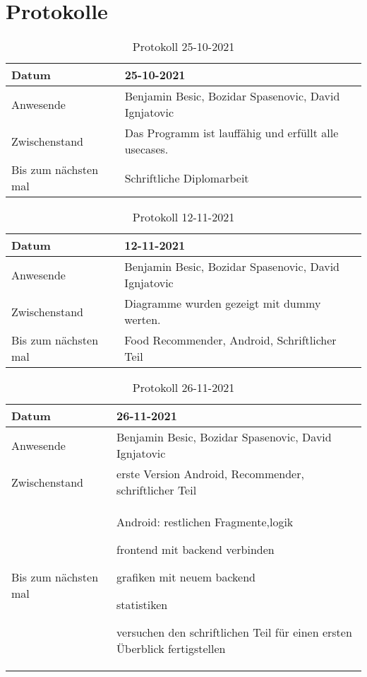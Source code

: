 \section{Protokolle}
\begin{table}
    
    \begin{tabular}{|p{3cm}|p{10cm}|  }
        \hline
        Datum & 25-10-2021\\
        \hline
        Anwesende & Benjamin Besic, Bozidar Spasenovic, David Ignjatovic\\
        \hline
        Zwischenstand&  Das Programm ist lauffähig und erfüllt alle usecases. \\
        \hline
        Bis zum nächsten mal &  Schriftliche Diplomarbeit\\
        \hline
        
    \end{tabular}
    \caption{Protokoll 25-10-2021}
    \label{tab:my_label}
\end{table}
\begin{table}
    \begin{tabular}{ |p{3cm}|p{10cm}|   }
        \hline
        Datum & 12-11-2021\\
        \hline
        Anwesende & Benjamin Besic, Bozidar Spasenovic, David Ignjatovic\\
        \hline
        Zwischenstand& Diagramme wurden gezeigt mit dummy werten.\\
        \hline
        Bis zum nächsten mal &  Food Recommender, Android, Schriftlicher Teil \\
        \hline
    \end{tabular}
    \caption{Protokoll 12-11-2021}
    \label{tab:my_label}
\end{table}
\begin{table}
    \begin{tabular}{ |p{3cm}|p{10cm}|  }
        \hline
        Datum & 26-11-2021\\
        \hline
        Anwesende & Benjamin Besic, Bozidar Spasenovic, David Ignjatovic\\

        \hline
        Zwischenstand&  erste Version Android, Recommender, schriftlicher Teil
    
    \\
        \hline
        Bis zum nächsten mal &  

       Android: restlichen Fragmente,logik
        

    frontend mit backend verbinden

    grafiken mit neuem backend

    statistiken

    versuchen den schriftlichen Teil für einen ersten Überblick fertigstellen


    
    \\
        \hline
    \end{tabular}
    \caption{Protokoll 26-11-2021}
    \label{tab:my_label}
\end{table}
